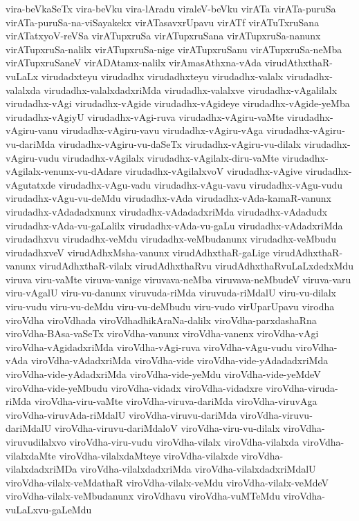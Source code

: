{vira-beVkaSeTx
vira-beVku
vira-lAradu
viraleV-beVku
virATa
virATa-puruSa
virATa-puruSa-na-viSayakekx
virATasavxrUpavu
virATf
virATuTxruSana
virATatxyoV-reVSa
virATupxruSa
virATupxruSana
virATupxruSa-nanunx
virATupxruSa-nalilx
virATupxruSa-nige
virATupxruSanu
virATupxruSa-neMba
virATupxruSaneV
virADAtamx-nalilx
virAmasAthxna-vAda
virudAthxthaR-vuLaLx
virudadxteyu
virudadhx
virudadhxteyu
virudadhx-valalx
virudadhx-valalxda
virudadhx-valalxdadxriMda
virudadhx-valalxve
virudadhx-vAgalilalx
virudadhx-vAgi
virudadhx-vAgide
virudadhx-vAgideye
virudadhx-vAgide-yeMba
virudadhx-vAgiyU
virudadhx-vAgi-ruva
virudadhx-vAgiru-vaMte
virudadhx-vAgiru-vanu
virudadhx-vAgiru-vavu
virudadhx-vAgiru-vAga
virudadhx-vAgiru-vu-dariMda
virudadhx-vAgiru-vu-daSeTx
virudadhx-vAgiru-vu-dilalx
virudadhx-vAgiru-vudu
virudadhx-vAgilalx
virudadhx-vAgilalx-diru-vaMte
virudadhx-vAgilalx-venunx-vu-dAdare
virudadhx-vAgilalxvoV
virudadhx-vAgive
virudadhx-vAgutatxde
virudadhx-vAgu-vadu
virudadhx-vAgu-vavu
virudadhx-vAgu-vudu
virudadhx-vAgu-vu-deMdu
virudadhx-vAda
virudadhx-vAda-kamaR-vanunx
virudadhx-vAdadadxnunx
virudadhx-vAdadadxriMda
virudadhx-vAdadudx
virudadhx-vAda-vu-gaLalilx
virudadhx-vAda-vu-gaLu
virudadhx-vAdadxriMda
virudadhxvu
virudadhx-veMdu
virudadhx-veMbudanunx
virudadhx-veMbudu
virudadhxveV
virudAdhxMsha-vanunx
virudAdhxthaR-gaLige
virudAdhxthaR-vanunx
virudAdhxthaR-vilalx
virudAdhxthaRvu
virudAdhxthaRvuLaLxdedxMdu
viruva
viru-vaMte
viruva-vanige
viruvava-neMba
viruvava-neMbudeV
viruva-varu
viru-vAgalU
viru-vu-danunx
viruvuda-riMda
viruvuda-riMdalU
viru-vu-dilalx
viru-vudu
viru-vu-deMdu
viru-vu-deMbudu
viru-vudo
virUparUpavu
virodha
viroVdha
viroVdhada
viroVdhadhikAraNa-dalilx
viroVdha-parxdashaRna
viroVdha-BAsa-vaSeTx
viroVdha-vanunx
viroVdha-vanenx
viroVdha-vAgi
viroVdha-vAgidadxriMda
viroVdha-vAgi-ruva
viroVdha-vAgu-vudu
viroVdha-vAda
viroVdha-vAdadxriMda
viroVdha-vide
viroVdha-vide-yAdadadxriMda
viroVdha-vide-yAdadxriMda
viroVdha-vide-yeMdu
viroVdha-vide-yeMdeV
viroVdha-vide-yeMbudu
viroVdha-vidadx
viroVdha-vidadxre
viroVdha-viruda-riMda
viroVdha-viru-vaMte
viroVdha-viruva-dariMda
viroVdha-viruvAga
viroVdha-viruvAda-riMdalU
viroVdha-viruvu-dariMda
viroVdha-viruvu-dariMdalU
viroVdha-viruvu-dariMdaloV
viroVdha-viru-vu-dilalx
viroVdha-viruvudilalxvo
viroVdha-viru-vudu
viroVdha-vilalx
viroVdha-vilalxda
viroVdha-vilalxdaMte
viroVdha-vilalxdaMteye
viroVdha-vilalxde
viroVdha-vilalxdadxriMDa
viroVdha-vilalxdadxriMda
viroVdha-vilalxdadxriMdalU
viroVdha-vilalx-veMdathaR
viroVdha-vilalx-veMdu
viroVdha-vilalx-veMdeV
viroVdha-vilalx-veMbudanunx
viroVdhavu
viroVdha-vuMTeMdu
viroVdha-vuLaLxvu-gaLeMdu
}
